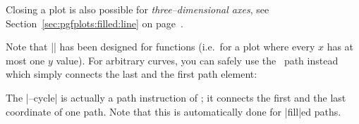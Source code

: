 Closing a plot is also possible for \emph{three--dimensional axes}, see Section~\ref{sec:pgfplots:filled:line} on page~\pageref{sec:pgfplots:filled:line}.

Note that |\closedcycle| has been designed for functions (i.e.\ for a plot where every $x$ has at most one $y$ value). For arbitrary curves, you can safely use the \tikzname\ path  instead which simply connects the last and the first path element:
\begin{codeexample}[]
\end{codeexample}

\begin{codeexample}[]
\end{codeexample}

\begin{codeexample}[]
\end{codeexample}
The |--cycle| is actually a path instruction of \cite{tikz}; it connects the first and the last coordinate of one path. Note that this is automatically done for |fill|ed paths.
